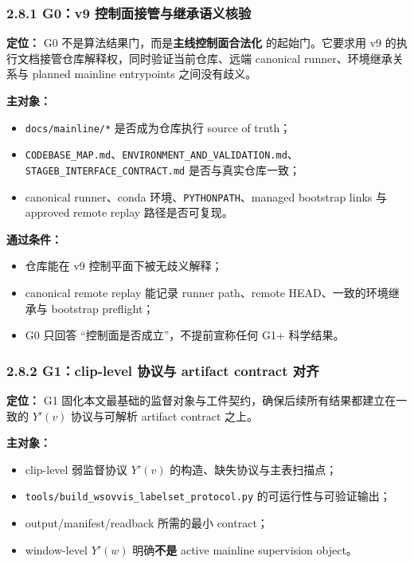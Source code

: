 \documentclass[UTF8]{ctexart}
\begin{document}
\subsubsection*{2.8.1 G0：v9 控制面接管与继承语义核验}
\textbf{定位：} G0 不是算法结果门，而是\textbf{主线控制面合法化} 的起始门。它要求用 v9 的执行文档接管仓库解释权，同时验证当前仓库、远端 canonical runner、环境继承关系与 planned mainline entrypoints 之间没有歧义。

\textbf{主对象：}
\begin{itemize}
\item \texttt{docs/mainline/*} 是否成为仓库执行 source of truth；
\item \texttt{CODEBASE\_MAP.md}、\texttt{ENVIRONMENT\_AND\_VALIDATION.md}、\texttt{STAGEB\_INTERFACE\_CONTRACT.md} 是否与真实仓库一致；
\item canonical runner、conda 环境、\texttt{PYTHONPATH}、managed bootstrap links 与 approved remote replay 路径是否可复现。
\end{itemize}

\textbf{通过条件：}
\begin{itemize}
\item 仓库能在 v9 控制平面下被无歧义解释；
\item canonical remote replay 能记录 runner path、remote HEAD、一致的环境继承与 bootstrap preflight；
\item G0 只回答 ``控制面是否成立''，不提前宣称任何 G1+ 科学结果。
\end{itemize}

\subsubsection*{2.8.2 G1：clip-level 协议与 artifact contract 对齐}
\textbf{定位：} G1 固化本文最基础的监督对象与工件契约，确保后续所有结果都建立在一致的 $Y'(v)$ 协议与可解析 artifact contract 之上。

\textbf{主对象：}
\begin{itemize}
\item clip-level 弱监督协议 $Y'(v)$ 的构造、缺失协议与主表扫描点；
\item \texttt{tools/build\_wsovvis\_labelset\_protocol.py} 的可运行性与可验证输出；
\item output/manifest/readback 所需的最小 contract；
\item window-level $Y'(w)$ 明确\textbf{不是} active mainline supervision object。
\end{itemize}
\end{document}
